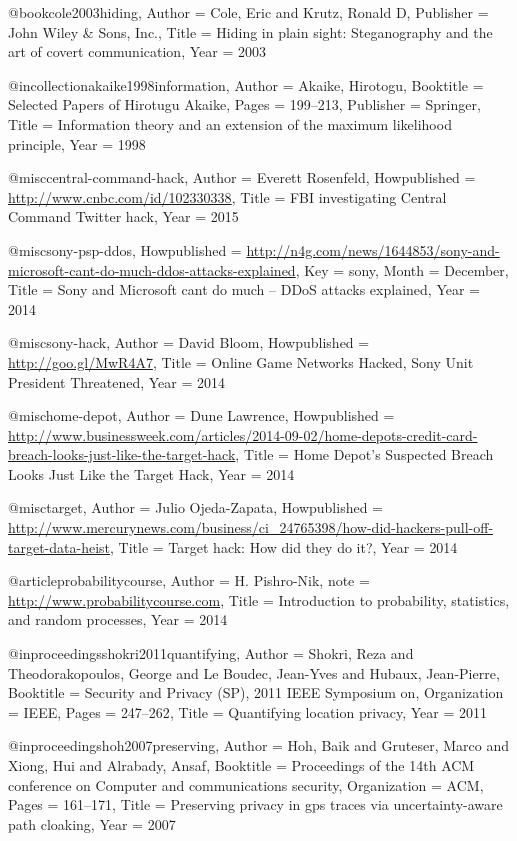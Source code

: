 {{{{{	@book{cole2003hiding,
	Author = {Cole, Eric and Krutz, Ronald D},
	Publisher = {John Wiley \& Sons, Inc.},
	Title = {Hiding in plain sight: Steganography and the art of covert communication},
	Year = {2003}}
	
	@incollection{akaike1998information,
	Author = {Akaike, Hirotogu},
	Booktitle = {Selected Papers of Hirotugu Akaike},
	Pages = {199--213},
	Publisher = {Springer},
	Title = {Information theory and an extension of the maximum likelihood principle},
	Year = {1998}}
	
	@misc{central-command-hack,
	Author = {Everett Rosenfeld},
	Howpublished = {\url{http://www.cnbc.com/id/102330338}},
	Title = {{FBI investigating Central Command Twitter hack}},
	Year = {2015}}
	
	@misc{sony-psp-ddos,
	Howpublished = {\url{http://n4g.com/news/1644853/sony-and-microsoft-cant-do-much-ddos-attacks-explained}},
	Key = {sony},
	Month = {December},
	Title = {{Sony and Microsoft cant do much -- DDoS attacks explained}},
	Year = {2014}}
	
	@misc{sony-hack,
	Author = {David Bloom},
	Howpublished = {\url{http://goo.gl/MwR4A7}},
	Title = {{Online Game Networks Hacked, Sony Unit President Threatened}},
	Year = {2014}}
	
	@misc{home-depot,
	Author = {Dune Lawrence},
	Howpublished = {\url{http://www.businessweek.com/articles/2014-09-02/home-depots-credit-card-breach-looks-just-like-the-target-hack}},
	Title = {{Home Depot's Suspected Breach Looks Just Like the Target Hack}},
	Year = {2014}}
	
	@misc{target,
	Author = {Julio Ojeda-Zapata},
	Howpublished = {\url{http://www.mercurynews.com/business/ci_24765398/how-did-hackers-pull-off-target-data-heist}},
	Title = {{Target hack: How did they do it?}},
	Year = {2014}}
	
	
	@article{probabilitycourse,
	Author = {H. Pishro-Nik},
	note = {\url{http://www.probabilitycourse.com}},
	Title = {Introduction to probability, statistics, and random processes},
	Year = {2014}}
	
	
	
	@inproceedings{shokri2011quantifying,
	Author = {Shokri, Reza and Theodorakopoulos, George and Le Boudec, Jean-Yves and Hubaux, Jean-Pierre},
	Booktitle = {Security and Privacy (SP), 2011 IEEE Symposium on},
	Organization = {IEEE},
	Pages = {247--262},
	Title = {Quantifying location privacy},
	Year = {2011}}
	
	@inproceedings{hoh2007preserving,
	Author = {Hoh, Baik and Gruteser, Marco and Xiong, Hui and Alrabady, Ansaf},
	Booktitle = {Proceedings of the 14th ACM conference on Computer and communications security},
	Organization = {ACM},
	Pages = {161--171},
	Title = {Preserving privacy in gps traces via uncertainty-aware path cloaking},
	Year = {2007}}
	
}}}}}
